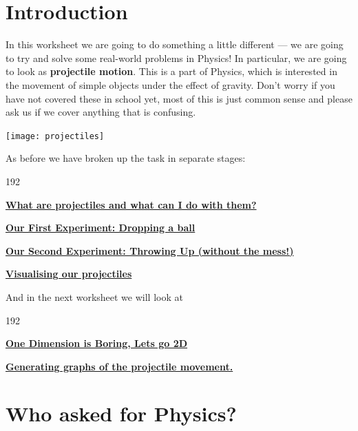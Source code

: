 \documentclass{coderdojo}
\newcommand\contentsitem[2]{
	\item \hyperref[#1]{\color{section}\bfseries #2}
}
\begin{document}
\maketitle


\section*{Introduction}

In this worksheet we are going to do something a little different --- we are going to try and solve some real-world problems in Physics!  
In particular, we are going to look as {\bfseries projectile motion}. This is a part of Physics, which is interested in the movement of simple objects under the effect of gravity.  Don't worry if you have not covered these in school yet, most of this is just common sense and please ask us if we cover anything that is confusing.  

\vspace{24pt}
\centerline{\texttt{[image: projectiles]}}

\vspace{24pt}
As before we have broken up the task in separate stages:

\begin{dingautolist}{192}

\contentsitem{physics}{What are projectiles and what can I do with them?}

\contentsitem{drop}{Our First Experiment: Dropping a ball}

\contentsitem{drop}{Our Second Experiment: Throwing Up (without the mess!)}

\contentsitem{drop}{Visualising our projectiles}

\end{dingautolist}

And in the next worksheet we will look at 

\begin{dingautolist}{192}

\contentsitem{drop}{One Dimension is Boring, Lets go 2D}

\contentsitem{drop}{Generating graphs of the projectile movement.}

\end{dingautolist}


\clearpage

\section{Who asked for Physics?}
\end{document}
